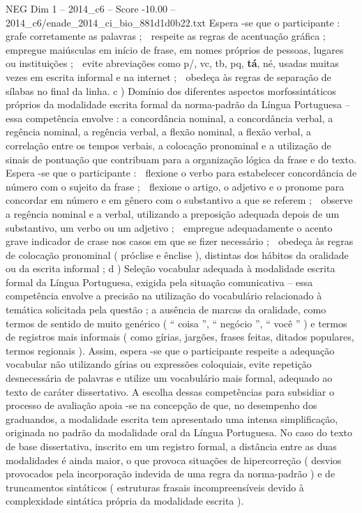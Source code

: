 \begin{textsample}{NEG Dim 1 – 2014\_c6 – Score -10.00 – 2014\_c6/enade\_2014\_ci\_bio\_881d1d0b22.txt}
Espera -se que o participante :  grafe corretamente as palavras ;  respeite as regras de acentuação gráfica ;  empregue maiúsculas em início de frase, em nomes próprios de pessoas, lugares ou instituições ;  evite abreviações como p/, vc, tb, pq, \textbf{tá}, né, usadas muitas vezes em escrita informal e na internet ;  obedeça às regras de separação de sílabas no final da linha. c ) Domínio dos diferentes aspectos morfossintáticos próprios da modalidade escrita formal da norma-padrão da Língua Portuguesa – essa competência envolve : a concordância nominal, a concordância verbal, a regência nominal, a regência verbal, a flexão nominal, a flexão verbal, a correlação entre os tempos verbais, a colocação pronominal e a utilização de sinais de pontuação que contribuam para a organização lógica da frase e do texto.
Espera -se que o participante :  flexione o verbo para estabelecer concordância de número com o sujeito da frase ;  flexione o artigo, o adjetivo e o pronome para concordar em número e em gênero com o substantivo a que se referem ;  observe a regência nominal e a verbal, utilizando a preposição adequada depois de um substantivo, um verbo ou um adjetivo ;  empregue adequadamente o acento grave indicador de crase nos casos em que se fizer necessário ;  obedeça às regras de colocação pronominal ( próclise e ênclise ), distintas dos hábitos da oralidade ou da escrita informal ; d ) Seleção vocabular adequada à modalidade escrita formal da Língua Portuguesa, exigida pela situação comunicativa – essa competência envolve a precisão na utilização do vocabulário relacionado à temática solicitada pela questão ; a ausência de marcas da oralidade, como termos de sentido de muito genérico ( “ coisa ”, “ negócio ”, “ você ” ) e termos de registros mais informais ( como gírias, jargões, frases feitas, ditados populares, termos regionais ).
Assim, espera -se que o participante respeite a adequação vocabular não utilizando gírias ou expressões coloquiais, evite repetição desnecessária de palavras e utilize um vocabulário mais formal, adequado ao texto de caráter dissertativo.
A escolha dessas competências para subsidiar o processo de avaliação apoia -se na concepção de que, no desempenho dos graduandos, a modalidade escrita tem apresentado uma intensa simplificação, originada no padrão da modalidade oral da Língua Portuguesa.
No caso do texto de base dissertativa, inscrito em um registro formal, a distância entre as duas modalidades é ainda maior, o que provoca situações de hipercorreção ( desvios provocados pela incorporação indevida de uma regra da norma-padrão ) e de truncamentos sintáticos ( estruturas frasais incompreensíveis devido à complexidade sintática própria da modalidade escrita ).

\end{textsample}
